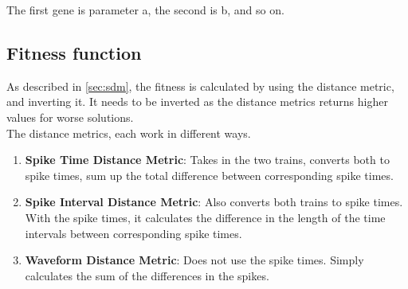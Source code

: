  The first gene is parameter a, the second is b, and so on. 
 

\subsection{Fitness function}

As described in \autoref{sec:sdm}, the fitness is calculated by using the distance metric, and inverting it. It needs
to be inverted as the distance metrics returns higher values for worse solutions. \\

The distance metrics, each work in different ways.

\begin{enumerate}

	\item \textbf{Spike Time Distance Metric}: Takes in the two trains, converts both to spike times, sum up the 
	total difference between corresponding spike times. 
	
	\item \textbf{Spike Interval Distance Metric}: Also converts both trains to spike times. With the spike times, 
	it calculates the difference in the length of the time intervals between corresponding spike times. 
	
	\item \textbf{Waveform Distance Metric}: Does not use the spike times. Simply calculates the sum of the 
	differences in the spikes. 
	
\end{enumerate}

